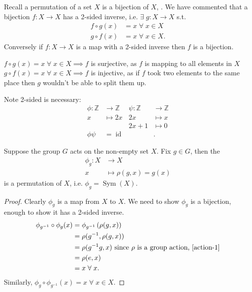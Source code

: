 \begin{remark}
    Recall a permutation of a set $X$ is a bijection of $X$, .
    We have commented that a bijection $f : X \to X$ has a 2-sided inverse, i.e. $\exists \; g : X \to X$ s.t.
    \begin{align*}
        f \circ g (x) &= x \; \forall \; x \in X \\
        g \circ f (x) &= x \; \forall \; x \in X.
    \end{align*}
    Conversely if $f : X \to X$ is a map with a 2-sided inverse then $f$ is a bijection.

    $f \circ g(x) = x \; \forall \; x \in X \implies f$ is surjective, as $f$ is mapping to all elements in $X$ \\
    $g \circ f(x) = x \; \forall \; x \in X \implies f$ is injective, as if $f$ took two elements to the same place then $g$ wouldn't be able to split them up.

    Note 2-sided is necessary:
    \begin{align*}
        \phi : \mathbb{Z} &\to \mathbb{Z} & \psi : \mathbb{Z} &\to \mathbb{Z}\\
        x &\mapsto 2x & 2x & \mapsto x \\
        && 2x + 1 &\mapsto 0 \\
        \phi \psi &= \operatorname{id} &&.
    \end{align*} 
\end{remark} 

\begin{lemma} \label{lem:16}
    Suppose the group $G$ acts on the non-empty set $X$.
    Fix $g \in G$, then the 
    \begin{align*}
        \phi_g : X &\to X \\
        x &\mapsto \rho(g, x) = g(x)
    \end{align*} is a permutation of $X$, i.e. $\phi_g = \operatorname{Sym}(X)$.
\end{lemma} 

\begin{proof}
    Clearly $\phi_g$ is a map from $X$ to $X$.
    We need to show $\phi_g$ is a bijection, enough to show it has a 2-sided inverse.
    \begin{align*}
        \phi_{g^{-1}} \circ \phi_g (x) &= \phi_{g^{-1}} \left( \rho (g, x) \right) \\
        &= \rho(g^{-1}, \rho(g, x)) \\
        &= \rho(g^{-1} g, x) \text{ since $\rho$ is a group action, \ref{action-1}} \\
        &= \rho(e, x) \\
        &= x \; \forall \; x.
    \end{align*} 
    Similarly, $\phi_g \circ \phi_{g^{-1}}(x) = x \; \forall \; x \in X$.
\end{proof} 

